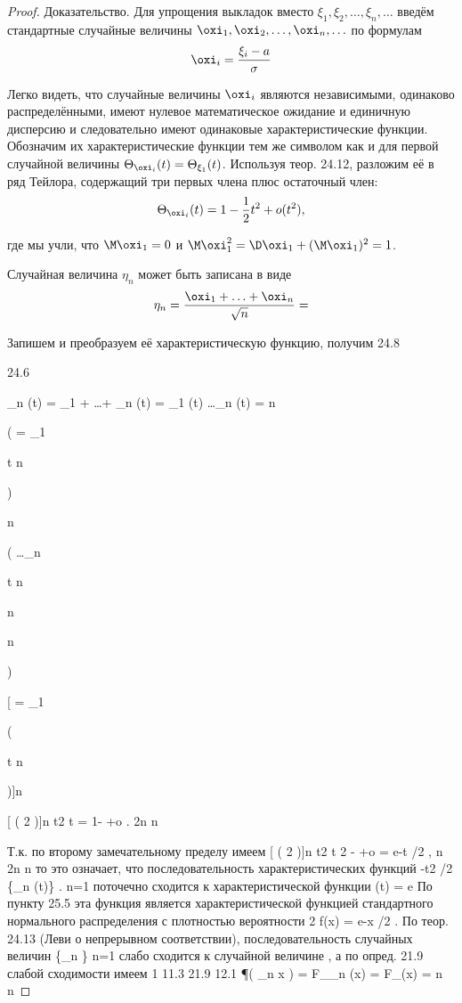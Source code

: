\begin{proof}

Доказательство. Для упрощения выкладок вместо $\xi_1 , \xi_2 , \ldots , \xi_n , \ldots$
введём стандартные случайные величины $\oxi_1 , \oxi_2 , \ldots , \oxi_n , \ldots$ по формулам
$$
\oxi_i=\frac{\xi_i-a}{\sigma}
$$

\sigma

Легко видеть, что случайные величины $\oxi_i$ являются независимыми, одинаково распределёнными, имеют нулевое математическое ожидание и единичную дисперсию и следовательно имеют одинаковые характеристические функции. Обозначим их характеристические функции тем же символом как и для первой случайной величины $\Theta_{\oxi_i}(t) = \Theta_{\xi_1} (t)$. Используя теор. 24.12, разложим её в ряд Тейлора, содержащий три первых члена плюс остаточный член:
$$
\Theta_{\oxi_i}(t)=1-\frac{1}{2}t^2+o(t^2),
$$

где мы учли, что $\M\oxi_1 = 0$ и $\M\oxi_1^2 = \D\oxi_1 + (\M\oxi_1)^2 = 1$.

Случайная величина $\eta_n$ может быть записана в виде
$$\eta_n =\frac{\oxi_1+\ldots+\oxi_n}{\sqrt{n}}=
$$

Запишем и преобразуем её характеристическую функцию, получим
24.8

24.6

\Theta\eta_n (t) = \Theta \sqrt\xi_1 + \ldots + \sqrt\xi_n (t) = \Theta \sqrt\xi_1 (t) \cdot \ldots \cdot \Theta \sqrt\xi_n (t) =
n

(
= \Theta \xi_1

t
\sqrt
n

)

n

(
\cdot \ldots \cdot \Theta \xi_n

t
\sqrt
n

n

n

)

[
= \Theta \xi_1

(

t
\sqrt
n

)]n

[
( 2 )]n
t2
t
= 1-
+o
.
2n
n

Т.к. по второму замечательному пределу имеем
[
( 2 )]n
t2
t
2
 -
+o
= e-t /2 ,
n\to\infty
2n
n
то это означает, что последовательность характеристических функций
-t2 /2
\{\Theta\eta_n (t)\}\infty
.
n=1 поточечно сходится к характеристической функции \Theta\eta (t) = e
По пункту 25.5 эта функция является характеристической функцией стандартного нормального распределения с плотностью вероятности
2
f\eta (x) = \pi e-x /2 . По теор. 24.13 (Леви о непрерывном соответствии), последовательность случайных величин \{\eta_n \}\infty
n=1 слабо сходится к случайной
величине \eta, а по опред. 21.9 слабой сходимости имеем
1
11.3
21.9
12.1
\lim \P ( \eta_n \leq x ) = \lim F_\eta_n (x) = F_\eta (x) = \sqrt
n\to\infty
n\to{}\pi


\end{proof}
